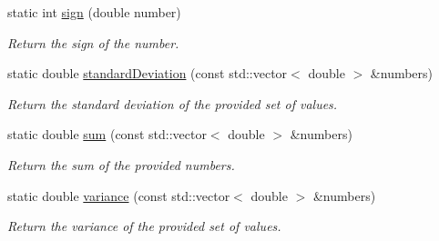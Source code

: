 \begin{DoxyCompactItemize}
static int \hyperlink{classmultiscale_1_1Numeric_a2b3058c5ad27aaaef338a29b96cdbced}{sign} (double number)
\begin{DoxyCompactList}\small\item\em \-Return the sign of the number. \end{DoxyCompactList}\item 
static double \hyperlink{classmultiscale_1_1Numeric_aa842f3143ada026759ec0474816c97ae}{standard\-Deviation} (const std\-::vector$<$ double $>$ \&numbers)
\begin{DoxyCompactList}\small\item\em \-Return the standard deviation of the provided set of values. \end{DoxyCompactList}\item 
static double \hyperlink{classmultiscale_1_1Numeric_aca9366c38b9b992793dd364b8e421bbd}{sum} (const std\-::vector$<$ double $>$ \&numbers)
\begin{DoxyCompactList}\small\item\em \-Return the sum of the provided numbers. \end{DoxyCompactList}\item 
static double \hyperlink{classmultiscale_1_1Numeric_a91bf7963069d7a51f01dff965508039c}{variance} (const std\-::vector$<$ double $>$ \&numbers)
\begin{DoxyCompactList}\small\item\em \-Return the variance of the provided set of values. \end{DoxyCompactList}\end{DoxyCompactItemize}
